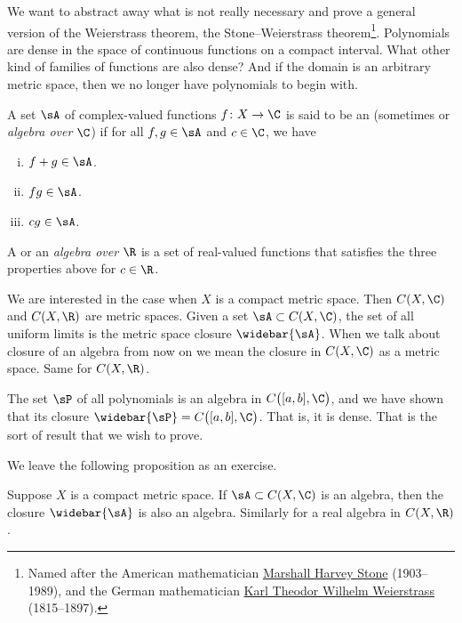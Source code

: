 We want to abstract away what is not really
necessary and prove a general version of the Weierstrass theorem,
the Stone--Weierstrass theorem\footnote{%
Named after the American mathematician
\href{https://en.wikipedia.org/wiki/Marshall_Harvey_Stone}{Marshall Harvey Stone}
(1903--1989), and the German mathematician
\href{https://en.wikipedia.org/wiki/Karl_Weierstrass}{Karl Theodor Wilhelm Weierstrass}
(1815--1897).}.
Polynomials are dense in the space of continuous
functions on a compact interval.  What other kind of families of
functions are also dense?  And if the domain is an
arbitrary metric space, then we no longer have polynomials
to begin with.

\begin{defn}
\pagebreak[2]
A set $\sA$ of complex-valued functions $f \colon X \to \C$ is said to be an 
\emph{} (sometimes
\emph{} or \emph{algebra over $\C$}) if for all $f,
g \in \sA$ and $c \in \C$, we have
\begin{enumerate}[(i)]
\item $f+g \in \sA$.
\item $fg \in \sA$.
\item $cg \in \sA$.
\end{enumerate}
A \emph{} or an
\emph{algebra over $\R$} is a set of real-valued
functions that satisfies the three properties above for $c \in \R$.
\end{defn}

We are interested in the case when
$X$ is a compact metric space.  Then
$C(X,\C)$ and $C(X,\R)$ are metric spaces.
Given a set $\sA \subset C(X,\C)$, the set of all uniform
limits is the metric space closure $\widebar{\sA}$.
When we talk about closure of an algebra
from now on we mean the closure in $C(X,\C)$
as a metric space.  Same for $C(X,\R)$.

The set $\sP$ of all polynomials is an algebra in
$C\bigl([a,b],\C\bigr)$, and we
have shown that its closure $\widebar{\sP} = C\bigl([a,b],\C\bigr)$.
That is, it is dense.  That is the sort of result that we wish to prove.

We leave the following proposition as an exercise.

\begin{prop} \label{prop:closureofalgebra}
Suppose $X$ is a compact metric space.
If $\sA \subset C(X,\C)$ is an algebra, then the closure $\widebar{\sA}$ is also an algebra.
Similarly for a real algebra in $C(X,\R)$.
\end{prop}

